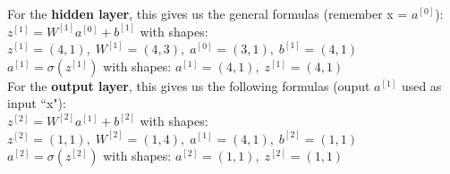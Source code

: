 \documentclass[11pt, a4paper]{article}
\begin{document}
\begin{spacing}{1.1}
	\noindent For the \textbf{hidden layer}, this gives us the general formulas (remember x = $a^{[0]}$): \vspace*{1mm} \\
	\hspace*{3mm} $z^{[1]} = W^{[1]}a^{[0]} + b^{[1]}$ with shapes: $z^{[1]}=(4,1),\; W^{[1]}=(4,3),\; a^{[0]}=(3,1),\; b^{[1]}=(4,1)$ \vspace*{1mm} \\
	\hspace*{3mm} $a^{[1]} = \sigma(z^{[1]})$ with shapes: $a^{[1]}=(4,1),\; z^{[1]}=(4,1)$ \vspace*{2mm} \\
	For the \textbf{output layer}, this gives us the following formulas (ouput $a^{[1]}$ used as input ``x"): \vspace*{1mm} \\
	\hspace*{3mm} $z^{[2]} = W^{[2]}a^{[1]} + b^{[2]}$ with shapes: $z^{[2]}=(1,1),\; W^{[2]}=(1,4),\; a^{[1]}=(4,1),\; b^{[2]}=(1,1)$ \vspace*{1mm} \\
	\hspace*{3mm} $a^{[2]} = \sigma(z^{[2]})$ with shapes: $a^{[2]}=(1,1),\; z^{[2]}=(1,1)$

\end{spacing}
\end{document}
